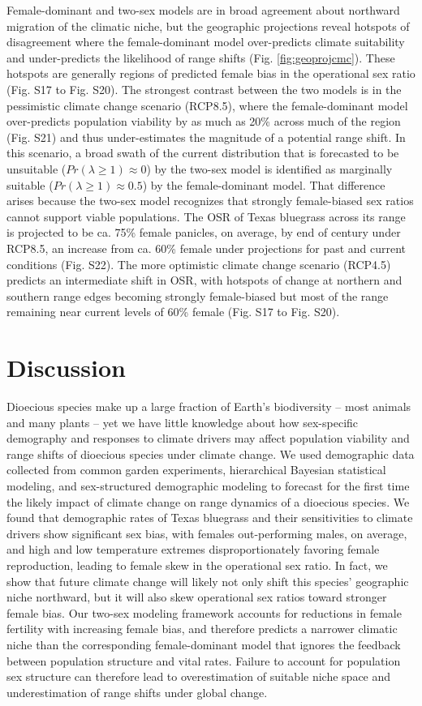 \documentclass[9pt,twocolumn,twoside,lineno]{pnas-new}
\begin{document}
Female-dominant and two-sex models are in broad agreement about northward migration of the climatic niche, but the geographic projections reveal hotspots of disagreement where the female-dominant model over-predicts climate suitability and under-predicts the likelihood of range shifts (Fig. \ref{fig:geoprojcmc}). 
These hotspots are generally regions of predicted female bias in the operational sex ratio (Fig. S17 to Fig. S20). 
The strongest contrast between the two models is in the pessimistic climate change scenario (RCP8.5), where the female-dominant model over-predicts population viability by as much as 20\% across much of the region (Fig. S21) and thus under-estimates the magnitude of a potential range shift. 
In this scenario, a broad swath of the current distribution that is forecasted to be unsuitable ($Pr(\lambda \ge 1) \approx 0$) by the two-sex model is identified as marginally suitable ($Pr(\lambda \ge 1) \approx 0.5$) by the female-dominant model. 
That difference arises because the two-sex model recognizes that strongly female-biased sex ratios cannot support viable populations. 
The OSR of Texas bluegrass across its range is projected to be ca. 75\% female panicles, on average, by end of century under RCP8.5, an increase from ca. 60\% female under projections for past and current conditions (Fig. S22). 
The more optimistic climate change scenario (RCP4.5) predicts an intermediate shift in OSR, with hotspots of change at northern and southern range edges becoming strongly female-biased but most of the range remaining near current levels of 60\% female (Fig. S17 to Fig. S20). 

\section*{Discussion}
Dioecious species make up a large fraction of Earth's biodiversity -- most animals and many plants -- yet we have little knowledge about how sex-specific demography and responses to climate drivers may affect population viability and range shifts of dioecious species under climate change.
We used demographic data collected from common garden experiments, hierarchical Bayesian statistical modeling, and sex-structured demographic modeling to forecast for the first time the likely impact of climate change on range dynamics of a dioecious species.
We found that demographic rates of Texas bluegrass and their sensitivities to climate drivers show significant sex bias, with females out-performing males, on average, and high and low temperature extremes disproportionately favoring female reproduction, leading to female skew in the operational sex ratio. 
In fact, we show that future climate change will likely not only shift this species' geographic niche northward, but it will also skew operational sex ratios toward stronger female bias. 
Our two-sex modeling framework accounts for reductions in female fertility with increasing female bias, and therefore predicts a narrower climatic niche than the corresponding female-dominant model that ignores the feedback between population structure and vital rates. 
Failure to account for population sex structure can therefore lead to overestimation of suitable niche space and underestimation of range shifts under global change. 
\end{document}

